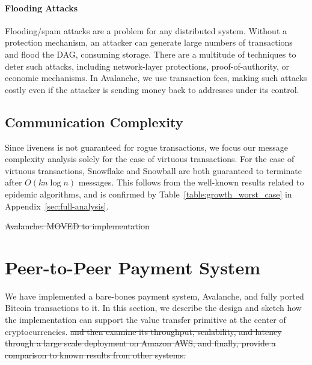 \documentclass[letterpaper,twocolumn,10pt]{article}
\newcommand{\tronly}[2]{#1}
\newcommand{\editremove}[1]{{\color{red}\sout{#1}}}
\newcommand{\editchange}[1]{{\color{orange}#1}}
\theoremstyle{definition}
\begin{document}
\paragraph{Flooding Attacks}
Flooding/spam attacks are a problem for any distributed system. 
Without a protection mechanism, an attacker can generate large numbers of transactions and flood the DAG, consuming storage. 
There are a multitude of techniques to deter such attacks, including network-layer protections, proof-of-authority, or economic mechanisms. 
In Avalanche, we use transaction fees, making such attacks costly even if the attacker is sending money back to addresses under its control.

\subsection{Communication Complexity}\tronly{}{\vspace{-0.5em}}
Since liveness is not guaranteed for rogue transactions, we focus our message complexity analysis solely for the case of virtuous transactions.
For the case of virtuous transactions, Snowflake and Snowball are both guaranteed to terminate after $O(kn\log n)$ messages.
This follows from the well-known results related to epidemic algorithms\cite{demers1987epidemic}, and is confirmed by Table~\ref{table:growth_worst_case} in Appendix~\ref{sec:full-analysis}.

\editremove{Avalanche: MOVED to implementation}

\section{Peer-to-Peer Payment System}\tronly{}{\vspace{-0.5em}}
\label{sec:implementation}


\editchange{We have implemented a bare-bones payment system, Avalanche, and
fully ported Bitcoin transactions to it.} In this section, \editchange{we describe the design and sketch how the implementation can support the value transfer primitive at the center of cryptocurrencies.} \editremove{and then examine its throughput, scalability, and latency through a large scale deployment on Amazon AWS\@, and finally, provide a comparison to known results from other systems.}
\end{document}
